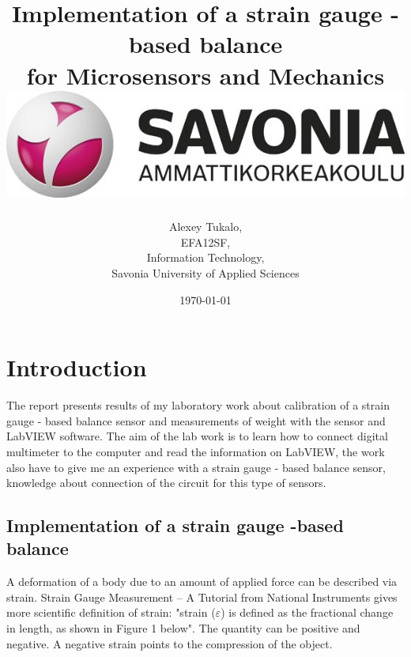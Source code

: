 \documentclass[english]{article}
\date{}
\begin{document}
\title{\vspace{2in}Implementation of a strain gauge - based balance\\
\small for Microsensors and Mechanics \\
\vspace{0.5in}\includegraphics{savonia.jpg}}

\nopagebreak
\maketitle


\vspace{3in}

\author{
\begin{flushright}
Alexey Tukalo,\\
EFA12SF,\\
Information Technology,\\
Savonia University of Applied Sciences
\end{flushright}
}

\date{\today}
\thispagestyle{empty}

\newpage
\setcounter{page}{1}
\setcounter{tocdepth}{2}
\tableofcontents

\newpage

\section{Introduction}
The report presents results of my laboratory work about calibration of a strain gauge - based balance sensor and measurements of weight with the sensor and LabVIEW software. The aim of the lab work is to learn how to connect digital multimeter to the computer and read the information on LabVIEW, the work also have to give me an experience with a strain gauge - based balance sensor, knowledge about connection of the circuit for this type of sensors.

\subsection{Implementation of a strain gauge -based balance}
A deformation of a body due to an amount of applied force can be described via strain. Strain Gauge Measurement – A Tutorial from National Instruments gives more scientific definition of strain: "strain ($\varepsilon$) is defined as the fractional change in length, as shown in Figure 1 below". The quantity can be positive and negative. A negative strain points to the compression of the object.\cite{str}
\end{document}
